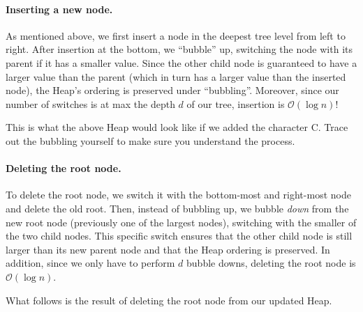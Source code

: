\documentclass{pset_template}
\begin{document}
\paragraph{Inserting a new node.}
As mentioned above, we first insert a node in the deepest tree level from left to right.
After insertion at the bottom, we ``bubble'' up, switching the node with its
parent if it has a smaller value.
Since the other child node is guaranteed to have a larger value than the
parent (which in turn has a larger value than the inserted node),
the Heap's ordering is preserved under ``bubbling''.
Moreover, since our number of switches is at max the depth $d$ of our tree,
insertion is $\mathcal{O}(\log{}n)$!

This is what the above Heap would look like if we added the character C.
Trace out the bubbling yourself to make sure you understand the process.
\begin{center}
\end{center}

\paragraph{Deleting the root node.}
To delete the root node, we switch it with the bottom-most and right-most node
and delete the old root.
Then, instead of bubbling up, we bubble \textit{down} from the new root node (previously
one of the largest nodes),
switching with the smaller of the two child nodes.
This specific switch ensures that the other child node is still larger
than its new parent node and that the Heap ordering is preserved.
In addition, since we only have to perform $d$ bubble downs,
deleting the root node is $\mathcal{O}(\log{}n)$.

What follows is the result of deleting the root node from our updated Heap.
\begin{center}
\end{center}
\end{document}
